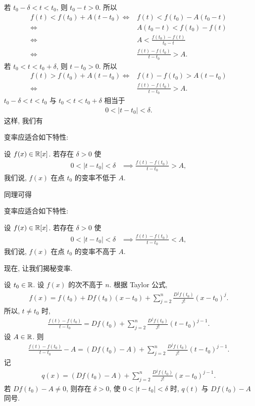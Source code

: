 若 $t_0 - \delta < t < t_0$, 则 $t_0 - t > 0$. 所以
\begin{align*}
    f (t) < f(t_0) + A (t - t_0)
    \iff {} & f (t) < f(t_0) - A (t_0 - t)       \\
    \iff {} & A (t_0 - t) < f(t_0) - f(t)        \\
    \iff {} & A < \frac{f(t_0) - f(t)}{t_0 - t}  \\
    \iff {} & \frac{f(t) - f(t_0)}{t - t_0} > A.
\end{align*}
若 $t_0 < t < t_0 + \delta$, 则 $t - t_0 > 0$. 所以
\begin{align*}
    f (t) > f(t_0) + A (t - t_0)
    \iff {} & f(t) - f(t_0) > A (t - t_0)        \\
    \iff {} & \frac{f(t) - f(t_0)}{t - t_0} > A.
\end{align*}
$t_0 - \delta < t < t_0$ 与 $t_0 < t < t_0 + \delta$ 相当于
\begin{align*}
    0 < |t - t_0| < \delta.
\end{align*}
这样, 我们有

\begin{proposition}
    变率应适合如下特性:

    设 $f (x) \in \mathbb{R}[x]$. 若存在 $\delta > 0$ 使
    \begin{align*}
        0 < |t - t_0| < \delta & \implies \frac{f(t) - f(t_0)}{t - t_0} > A,
    \end{align*}
    我们说, $f (x)$ 在点 $t_0$ 的变率不低于 $A$.
\end{proposition}

同理可得

\begin{proposition}
    变率应适合如下特性:

    设 $f (x) \in \mathbb{R}[x]$. 若存在 $\delta > 0$ 使
    \begin{align*}
        0 < |t - t_0| < \delta & \implies \frac{f(t) - f(t_0)}{t - t_0} < A,
    \end{align*}
    我们说, $f (x)$ 在点 $t_0$ 的变率不高于 $A$.
\end{proposition}

现在, 让我们揭秘变率.

设 $t_0 \in \mathbb{R}$. 设 $f(x)$ 的次不高于 $n$. 根据 Taylor 公式,
\begin{align*}
    f(x) = f(t_0) + Df(t_0) (x - t_0) + \sum_{j = 2}^{n} \frac{D^j f(t_0)}{j!} (x - t_0)^j.
\end{align*}
所以, $t \neq t_0$ 时,
\begin{align*}
    \frac{f(t) - f(t_0)}{t - t_0} = Df(t_0) + \sum_{j = 2}^{n} \frac{D^j f(t_0)}{j!} (t - t_0)^{j - 1}.
\end{align*}
设 $A \in \mathbb{R}$. 则
\begin{align*}
    \frac{f(t) - f(t_0)}{t - t_0} - A = (Df(t_0) - A) + \sum_{j = 2}^{n} \frac{D^j f(t_0)}{j!} (t - t_0)^{j - 1}.
\end{align*}
记
\begin{align*}
    q(x) = (Df(t_0) - A) + \sum_{j = 2}^{n} \frac{D^j f(t_0)}{j!} (x - t_0)^{j - 1}.
\end{align*}
若 $Df(t_0) - A \neq 0$, 则存在 $\delta > 0$, 使 $0 < |t - t_0| < \delta$ 时, $q(t)$ 与 $Df(t_0) - A$ 同号.

